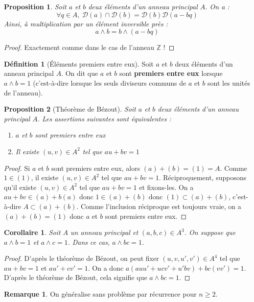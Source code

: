 \documentclass[french]{book}
\newcommand{\Z}{\mathbb{Z}}
\theoremstyle{plain}
\newtheorem{prop}{Proposition}[chapter]
\newtheorem{cor}{Corollaire}[chapter]
\theoremstyle{definition}
\newtheorem{dfn}{Définition}[chapter]
\newtheorem{rmq}{Remarque}[chapter]
\theoremstyle{remark}
\begin{document}
\begin{prop}
	Soit $a$ et $b$ deux éléments d'un anneau principal $A$. On a : $$\forall q\in A,\ \mathcal{D}(a)\cap\mathcal{D}(b)=\mathcal{D}(b)\mathcal{D}(a-bq)$$ Ainsi, à multiplication par un élément inversible près : $$a\wedge b=b\wedge(a-bq)$$
\end{prop}
\begin{proof}
	Exactement comme dans le cas de l'anneau $\Z$ !
\end{proof}
\begin{dfn}[Éléments premiers entre eux]
	Soit $a$ et $b$ deux éléments d'un anneau principal $A$. On dit que $a$ et $b$ sont \textbf{premiers entre eux} lorsque $a\wedge b=1$ (c'est-à-dire lorsque les seuls diviseurs communs de $a$ et $b$ sont les unités de l'anneau).
\end{dfn}
\begin{prop}[Théorème de Bézout]
	Soit $a$ et $b$ deux éléments d'un anneau principal $A$. Les assertions suivantes sont équivalentes : \begin{enumerate}
		\item $a$ et $b$ sont premiers entre eux
		\item Il existe $(u,v)\in A^2$ tel que $au+bv=1$
	\end{enumerate}
\end{prop}
\begin{proof}
	Si $a$ et $b$ sont premiers entre eux, alors $(a)+(b)=(1)=A$. Comme $1\in(1)$, il existe $(u,v)\in A^2$ tel que $au+bv=1$. Réciproquement, supposons qu'il existe $(u,v)\in A^2$ tel que $au+bv=1$ et fixons-les. On a $au+bv\in(a)+b(a)$ donc $1\in(a)+(b)$ donc $(1)\subset(a)+(b)$, c'est-à-dire $A\subset(a)+(b)$. Comme l'inclusion réciproque est toujours vraie, on a $(a)+(b)=(1)$ donc $a$ et $b$ sont premiers entre eux.
\end{proof}
\begin{cor}
	Soit $A$ un anneau principal et $(a,b,c)\in A^3$. On suppose que $a\wedge b=1$ et $a\wedge c=1$. Dans ce cas, $a\wedge bc=1$.
\end{cor}
\begin{proof}
	D'après le théorème de Bézout, on peut fixer $(u,v,u',v')\in A^4$ tel que $au+bv=1$ et $au'+cv'=1$. On a donc $a(auu'+ucv'+u'bv)+bc(vv')=1$. D'après le théorème de Bézout, cela signifie que $a\wedge bc=1$.
\end{proof}
\begin{rmq}
	On généralise sans problème par récurrence pour $n\geqslant 2$.
\end{rmq}
\end{document}
